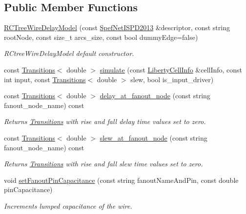 \subsection*{Public Member Functions}
\begin{DoxyCompactItemize}
\item 
\hyperlink{classRCTreeWireDelayModel_a239d4784b2d39b6042fe39bee4838c6b}{R\-C\-Tree\-Wire\-Delay\-Model} (const \hyperlink{classSpefNetISPD2013}{Spef\-Net\-I\-S\-P\-D2013} \&descriptor, const string root\-Node, const size\-\_\-t arcs\-\_\-size, const bool dummy\-Edge=false)
\begin{DoxyCompactList}\small\item\em R\-Ctree\-Wire\-Delay\-Model default constructor. \end{DoxyCompactList}\item 
const \hyperlink{classTransitions}{Transitions}$<$ double $>$ \hyperlink{classRCTreeWireDelayModel_a06312bef3b98f0903335227fd7ea0f31}{simulate} (const \hyperlink{structLibertyCellInfo}{Liberty\-Cell\-Info} \&cell\-Info, const int input, const \hyperlink{classTransitions}{Transitions}$<$ double $>$ slew, bool is\-\_\-input\-\_\-driver)
\item 
const \hyperlink{classTransitions}{Transitions}$<$ double $>$ \hyperlink{classRCTreeWireDelayModel_a7c769d54e8a520db1c5d4537d7e8b608}{delay\-\_\-at\-\_\-fanout\-\_\-node} (const string fanout\-\_\-node\-\_\-name) const 
\begin{DoxyCompactList}\small\item\em Returns \hyperlink{classTransitions}{Transitions} with rise and fall delay time values set to zero. \end{DoxyCompactList}\item 
const \hyperlink{classTransitions}{Transitions}$<$ double $>$ \hyperlink{classRCTreeWireDelayModel_aea4c7315bdd3715ca0c67707b2c32a8c}{slew\-\_\-at\-\_\-fanout\-\_\-node} (const string fanout\-\_\-node\-\_\-name) const 
\begin{DoxyCompactList}\small\item\em Returns \hyperlink{classTransitions}{Transitions} with rise and fall slew time values set to zero. \end{DoxyCompactList}\item 
void \hyperlink{classRCTreeWireDelayModel_a106079b64e0e6b84327fc5a9b4c29a6a}{set\-Fanout\-Pin\-Capacitance} (const string fanout\-Name\-And\-Pin, const double pin\-Capacitance)
\begin{DoxyCompactList}\small\item\em Increments lumped capacitance of the wire. \end{DoxyCompactList}\item 

\end{DoxyCompactItemize}
